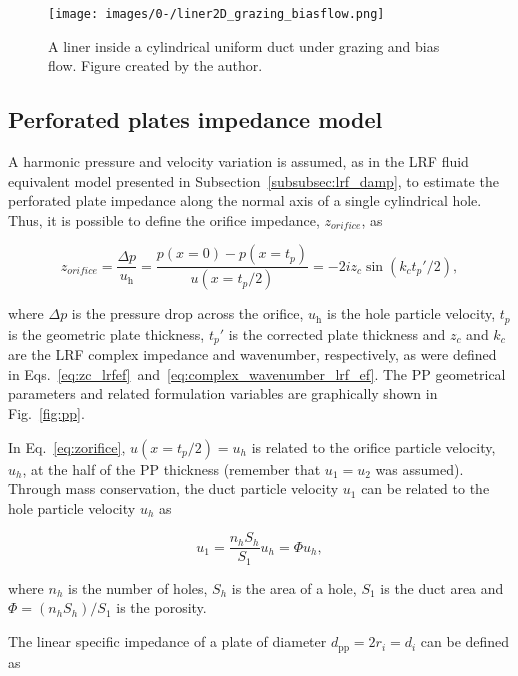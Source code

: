 \documentclass[12pt]{article}
\begin{document}
\begin{figure}[h!]
	\centering
	\texttt{[image: images/0-/liner2D\_grazing\_biasflow.png]} 
	\caption{A liner inside a cylindrical uniform duct under grazing and bias flow. Figure created by the author.}
	\label{fig:liner_2d}
\end{figure}

\subsection{Perforated plates impedance model}

A harmonic pressure and velocity variation is assumed, as in the \acrshort{LRF} fluid equivalent model presented in Subsection~\ref{subsubsec:lrf_damp}, to estimate the perforated plate impedance along the normal axis of a single cylindrical hole. Thus, it is possible to define the orifice impedance, $z_{orifice}$, as

\begin{equation} \label{eq:zorifice}
	z_{orifice} = \frac{\Delta p}{u_{\text{h}}} = \frac{p(x=0) - p(x=t_p)}{u(x=t_p/2)} = -2 i z_c \sin(k_c t_p' / 2),
\end{equation}

\noindent where $\Delta p$ is the pressure drop across the orifice, $u_{\text{h}}$ is the hole particle velocity, $t_p$ is the geometric plate thickness, $t_p'$ is the corrected plate thickness and $z_c$ and $k_c$ are the \acrshort{LRF} complex impedance and wavenumber, respectively, as were defined in Eqs.~\ref{eq:zc_lrfef}~and~\ref{eq:complex_wavenumber_lrf_ef}. The \acrshort{PP} geometrical parameters and related formulation variables are graphically shown in Fig.~\ref{fig:pp}.

In Eq.~\ref{eq:zorifice}, $u(x=t_p/2) = u_h$ is related to the orifice particle velocity, $u_h$, at the half of the \acrshort{PP} thickness (remember that $u_1=u_2$ was assumed). Through mass conservation, the duct particle velocity $u_1$ can be related to the hole particle velocity $u_h$ as \cite{Lee2005AcousticCO}

\begin{equation} \label{eq:mass_cons_pp}
	u_1 = \frac{n_h S_h}{S_1} u_h = \Phi u_h,
\end{equation}

\noindent where $n_h$ is the number of holes, $S_h$ is the area of a hole, $S_1$ is the duct area and $\Phi = (n_h S_h)/S_1 $ is the porosity. 

\noindent The linear specific impedance of a plate of diameter $d_{\text{pp}} = 2 r_i = d_i$ can be defined as
\end{document}
